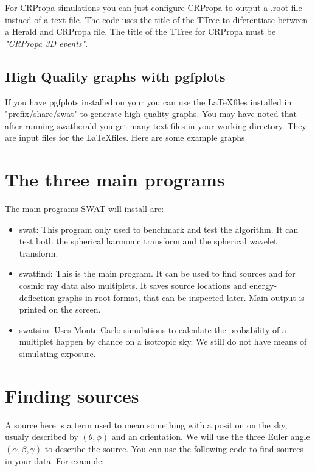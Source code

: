 \documentclass[12pt]{article}
\begin{document}
For CRPropa simulations you can just configure CRPropa to output a .root file
instaed of a text file.  The code uses the title of the TTree to diferentiate
between a Herald and CRPropa file. The title of the TTree for CRPropa must be
\textit{\color{brown}"CRPropa 3D events"}.

\subsection{High Quality graphs with pgfplots} \label{ch::pgfplots}
If you have pgfplots installed on your you can use the \LaTeX files installed
in {\color{brown}"prefix/share/swat"} to generate high quality graphs. You may
have noted that after running {\color{brown}swatherald}
you get many text files in your working directory. They are input files for the \LaTeX files. Here are some
example graphs \\
\vspace{1cm}

\section{The three main programs}
The main programs SWAT will install are:
\begin{itemize}
\item swat: This program only used to benchmark and test the algorithm. It can test
both the spherical harmonic transform and the spherical wavelet transform.
\item swatfind: This is the main program. It can be used to find sources and for cosmic ray data
also multiplets. It saves source locations and energy-deflection graphs in root format, that can
be inspected later. Main output is printed on the screen.
\item swatsim: Uses Monte Carlo simulations to calculate the probability of a multiplet happen by 
chance on a isotropic sky. We still do not have means of simulating exposure.
\end{itemize}

\section{Finding sources}

A source here is a term used to mean something with a position on the sky, usualy described
by $(\theta,\phi)$ and an orientation. We will use the three Euler angle $(\alpha,\beta,\gamma)$ to
describe the source. You can use the following code to find sources in your data.
For example:
\end{document}
